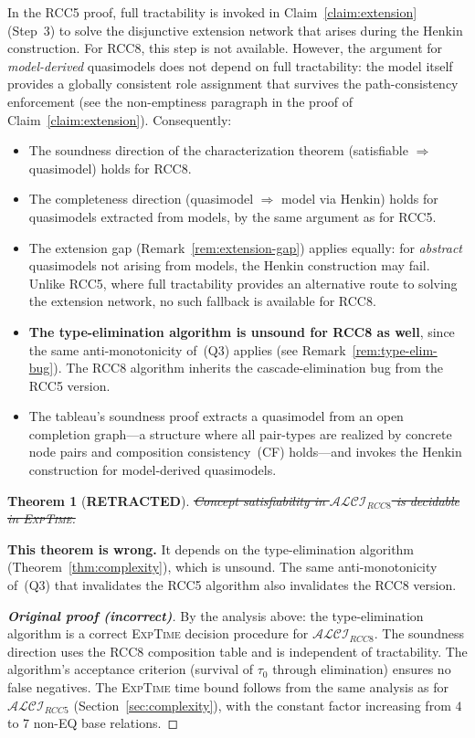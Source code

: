 \documentclass[a4paper,11pt]{article}
\newtheorem{theorem}{Theorem}[section]
\theoremstyle{definition}
\newcommand{\ALCIRCC}[1]{\ensuremath{\mathcal{ALCI}_{\mathit{RCC#1}}}}
\newcommand{\EXPTIME}{\textsc{ExpTime}}
\begin{document}
In the RCC5 proof, full tractability is invoked in
Claim~\ref{claim:extension} (Step~3) to solve the disjunctive
extension network that arises during the Henkin construction.  For
RCC8, this step is not available.  However, the argument for
\emph{model-derived} quasimodels does not depend on full
tractability: the model itself provides a globally consistent role
assignment that survives the path-consistency enforcement (see the
non-emptiness paragraph in the proof of Claim~\ref{claim:extension}).
Consequently:
\begin{itemize}[nosep]
  \item The soundness direction of the characterization theorem
    (satisfiable $\Rightarrow$ quasimodel) holds for RCC8.
  \item The completeness direction (quasimodel $\Rightarrow$ model
    via Henkin) holds for quasimodels extracted from models, by the
    same argument as for RCC5.
  \item The extension gap (Remark~\ref{rem:extension-gap}) applies
    equally: for \emph{abstract} quasimodels not arising from models,
    the Henkin construction may fail.  Unlike RCC5, where full
    tractability provides an alternative route to solving the extension
    network, no such fallback is available for RCC8.
  \item \textbf{The type-elimination algorithm is unsound for RCC8
    as well}, since the same anti-monotonicity of~(Q3) applies
    (see Remark~\ref{rem:type-elim-bug}).  The RCC8 algorithm
    inherits the cascade-elimination bug from the RCC5 version.
  \item The tableau's soundness proof extracts a quasimodel from an
    open completion graph---a structure where all pair-types are
    realized by concrete node pairs and composition consistency~(CF)
    holds---and invokes the Henkin construction for model-derived
    quasimodels.
\end{itemize}

\begin{theorem}[\textbf{RETRACTED}]
\label{thm:rcc8}
\sout{Concept satisfiability in $\ALCIRCC{8}$ is decidable in \EXPTIME.}
\end{theorem}

\noindent
\textbf{This theorem is wrong.}  It depends on the type-elimination
algorithm (Theorem~\ref{thm:complexity}), which is unsound.  The same
anti-monotonicity of~(Q3) that invalidates the RCC5 algorithm also
invalidates the RCC8 version.

\begin{proof}[\textbf{Original proof (incorrect)}]
By the analysis above: the type-elimination algorithm is a correct
\EXPTIME{} decision procedure for $\ALCIRCC{8}$.  The soundness
direction uses the RCC8 composition table and is independent of
tractability.  The algorithm's acceptance criterion (survival of
$\tau_0$ through elimination) ensures no false negatives.  The
\EXPTIME{} time bound follows from the same analysis as for
$\ALCIRCC{5}$ (Section~\ref{sec:complexity}), with the constant
factor increasing from $4$ to $7$ non-EQ base relations.
\end{proof}
\end{document}
